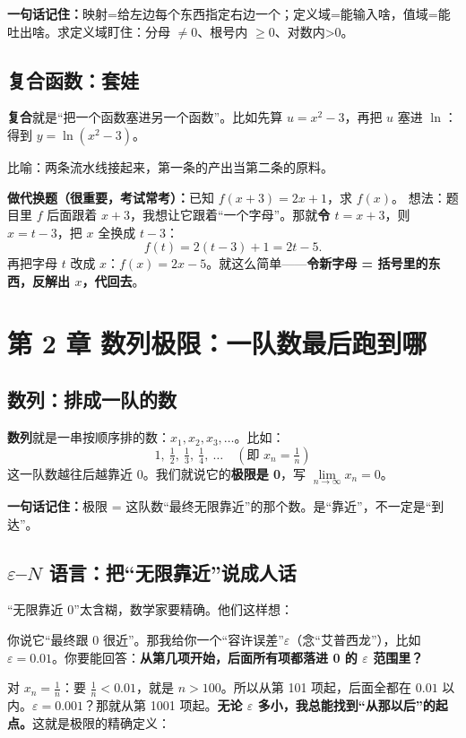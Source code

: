 ﻿\documentclass[11pt,a4paper,UTF8]{ctexart}
\newcommand{\eps}{\varepsilon}
\newcommand{\idea}[1]{\par\smallskip\noindent\colorbox{yellow!22}{\textbf{一句话记住：}#1}\par\smallskip}
\begin{document}
\idea{映射=给左边每个东西指定右边一个；定义域=能输入啥，值域=能吐出啥。求定义域盯住：分母 $\ne0$、根号内 $\ge0$、对数内>0。}

\subsection{复合函数：套娃}

\textbf{复合}就是“把一个函数塞进另一个函数”。比如先算 $u=x^2-3$，再把 $u$ 塞进 $\ln$：得到 $y=\ln(x^2-3)$。

比喻：两条流水线接起来，第一条的产出当第二条的原料。

\textbf{做代换题（很重要，考试常考）：}已知 $f(x+3)=2x+1$，求 $f(x)$。
想法：题目里 $f$ 后面跟着 $x+3$，我想让它跟着“一个字母”。那就\textbf{令 $t=x+3$}，则 $x=t-3$，把 $x$ 全换成 $t-3$：
$$f(t)=2(t-3)+1=2t-5.$$
再把字母 $t$ 改成 $x$：$\boxed{f(x)=2x-5}$。就这么简单——\textbf{令新字母 = 括号里的东西，反解出 $x$，代回去}。

\section{第 2 章 数列极限：一队数最后跑到哪}

\subsection{数列：排成一队的数}

\textbf{数列}就是一串按顺序排的数：$x_1,x_2,x_3,\dots$。比如：
$$1,\ \tfrac12,\ \tfrac13,\ \tfrac14,\ \dots\quad(\text{即 }x_n=\tfrac1n)$$
这一队数越往后越靠近 0。我们就说它的\textbf{极限是 0}，写 $\lim\limits_{n\to\infty}x_n=0$。

\idea{极限 = 这队数“最终无限靠近”的那个数。是“靠近”，不一定是“到达”。}

\subsection{$\eps$–$N$ 语言：把“无限靠近”说成人话}

“无限靠近 0”太含糊，数学家要精确。他们这样想：

你说它“最终跟 0 很近”。那我给你一个“容许误差”$\eps$（念“艾普西龙”），比如 $\eps=0.01$。你要能回答：\textbf{从第几项开始，后面所有项都落进 0 的 $\eps$ 范围里？}

对 $x_n=\frac1n$：要 $\frac1n<0.01$，就是 $n>100$。所以从第 101 项起，后面全都在 $0.01$ 以内。$\eps=0.001$？那就从第 1001 项起。\textbf{无论 $\eps$ 多小，我总能找到“从那以后”的起点。}这就是极限的精确定义：
\end{document}
